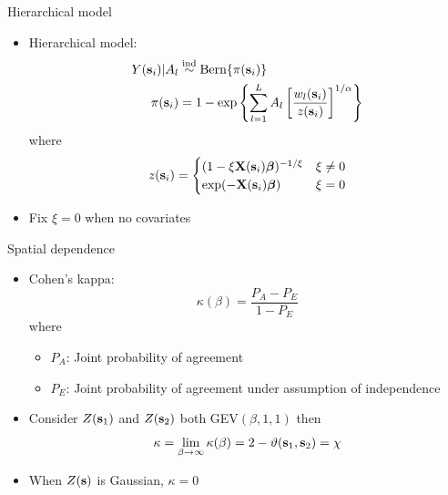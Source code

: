 \documentclass{beamer}
\begin{document}
\begin{frame}{Hierarchical model}
	\begin{itemize} \setlength{\itemsep}{1em}
		\item Hierarchical model:
		\begin{align*}
		Y(\mathbf{s}_i) | A_l &\stackrel{\mathrm{ind}}{\sim} \text{Bern}\{\pi(\mathbf{s}_i)\}\\
		\pi(\mathbf{s}_i) &= 1 - \exp\left\{ \sum_{l = 1}^L A_l \left[\frac{ w_l (\mathbf{s}_i) }{z(\mathbf{s}_i)} \right]^{1 / \alpha} \right\}\\
		\end{align*} \vspace{-0.5em}
		where $$z(\mathbf{s}_i) = \begin{cases}
		(1 - \xi \mathbf{X}(\mathbf{s}_i) \mbox{\boldmath $\beta$})^{-1 / \xi} & \xi \neq 0 \\
		\exp(-\mathbf{X}(\mathbf{s}_i) \mbox{\boldmath $\beta$}) & \xi = 0
		\end{cases}$$
    \item Fix $\xi = 0$ when no covariates
	\end{itemize}
\end{frame}

\begin{frame}{Spatial dependence}
	\begin{itemize} \setlength{\itemsep}{1em}
		\item Cohen's kappa: $$\kappa(\beta) = \frac{P_A - P_E}{1 - P_E}$$
		where
		\begin{itemize} \setlength{\itemsep}{0.5em}
			\item $P_A$: Joint probability of agreement
			\item $P_E$: Joint probability of agreement under assumption of independence
		\end{itemize}
		\item Consider $Z(\mathbf{s}_1)$ and $Z(\mathbf{s}_2)$ both GEV$(\beta, 1, 1)$ then $$\kappa = \lim_{\beta \rightarrow \infty} \kappa(\beta) = 2 - \vartheta(\mathbf{s}_1, \mathbf{s}_2) = \chi$$
		\item When $Z(\mathbf{s})$ is Gaussian, $\kappa = 0$
	\end{itemize}
\end{frame}
\end{document}
